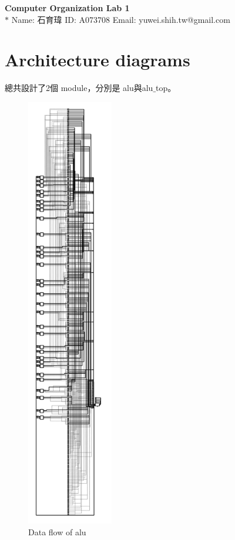 \documentclass[12pt,a4paper]{article}
\theoremstyle{definition}
\begin{document}
\noindent
{}

\begin{center}
\Large{\textbf{Computer Organization Lab 1}}\vspace{1mm}\\
\footnotesize{\color{blue}$*$ Name: 石育瑋  \quad ID: A073708 \quad Email: yuwei.shih.tw@gmail.com}
\end{center}

\section{Architecture diagrams}

總共設計了2個 module，分別是 alu與alu$\_$top。
\begin{figure}[H]
\centering
\includegraphics[height=19cm]{fig/alu.png}
\caption{Data flow of alu}
\label{fig:alu}
\end{figure}
\end{document}

